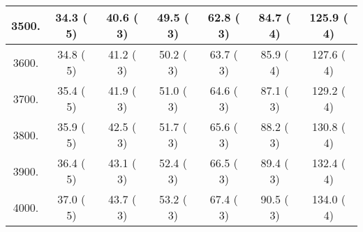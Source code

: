 \begin{tabular}{|c||c|c|c|c|c|c|}
\hline
 3500. &    34.3 (      5) &    40.6 (      3) &    49.5 (      3) &    62.8 (      3) &    84.7 (      4) &   125.9 (      4)\tabularnewline
\hline
 3600. &    34.8 (      5) &    41.2 (      3) &    50.2 (      3) &    63.7 (      3) &    85.9 (      4) &   127.6 (      4)\tabularnewline
\hline
 3700. &    35.4 (      5) &    41.9 (      3) &    51.0 (      3) &    64.6 (      3) &    87.1 (      3) &   129.2 (      4)\tabularnewline
\hline
 3800. &    35.9 (      5) &    42.5 (      3) &    51.7 (      3) &    65.6 (      3) &    88.2 (      3) &   130.8 (      4)\tabularnewline
\hline
 3900. &    36.4 (      5) &    43.1 (      3) &    52.4 (      3) &    66.5 (      3) &    89.4 (      3) &   132.4 (      4)\tabularnewline
\hline
 4000. &    37.0 (      5) &    43.7 (      3) &    53.2 (      3) &    67.4 (      3) &    90.5 (      3) &   134.0 (      4)\tabularnewline
\hline
\end{tabular}
